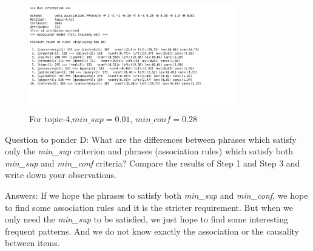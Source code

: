 \begin{enumerate}
   \begin{figure}[H]
     \caption{For topic-4,$min\_sup = 0.01$, $min\_conf = 0.28 $}
\includegraphics[width=0.8\textwidth]{Figures/4.png}
\centering
\end{figure}

Question to ponder D: What are the differences between phrases which satisfy only the {\it min\_sup} criterion and phrases (association rules) which satisfy both {\it min\_sup} and {\it min\_conf} criteria? Compare the results of Step 1 and Step 3 and write down your observations.

Answers: If we hope the phrases to satisfy both {\it min\_sup} and {\it min\_conf}, we hope to find some association rules and it is the stricter requirement. But when we only need the {\it min\_sup} to be satisfied, we just hope to find some interesting frequent patterns. And we do not know exactly the association or the causality between items. 

\end{enumerate}

